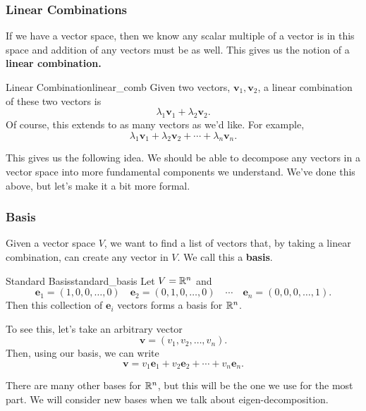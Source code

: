         \subsubsection{Linear Combinations}
        If we have a vector space, then we know any scalar multiple of a vector is in this space and addition of any vectors must be as well.  This gives us the notion of a \textbf{linear combination.}
        
        \begin{ex}{Linear Combination}{linear_comb}
        Given two vectors, $\mathbf{v}_1, \mathbf{v}_2$, a linear combination of these two vectors is 
        \[
        \lambda_1 \mathbf{v}_1 + \lambda_2 \mathbf{v}_2.
        \]
        Of course, this extends to as many vectors as we'd like. For example,
        \[
        \lambda_1 \mathbf{v}_1 + \lambda_2 \mathbf{v}_2 + \cdots + \lambda_n \mathbf{v}_n.
        \]
        \end{ex}
        
        This gives us the following idea.  We should be able to decompose any vectors in a vector space into more fundamental components we understand.  We've done this above, but let's make it a bit more formal.
        
        \subsubsection{Basis}
        Given a vector space $V$, we want to find a list of vectors that, by taking a linear combination, can create any vector in $V$.  We call this a \textbf{basis}.
        
        \begin{ex}{Standard Basis}{standard_basis}
        Let $V=\mathbb{R}^n$ and
        \[
        \mathbf{e}_1=(1,0,0,\dots,0) \quad \mathbf{e}_2=(0,1,0,\dots,0) \quad \cdots \quad \mathbf{e}_n=(0,0,0,\dots,1). 
        \]
        Then this collection of $\mathbf{e}_i$ vectors forms a basis for $\mathbb{R}^n$.  
        
        To see this, let's take an arbitrary vector 
        \[
        \mathbf{v}=(v_1,v_2,\dots,v_n).
        \]
        Then, using our basis, we can write
        \[
        \mathbf{v}=v_1 \mathbf{e}_1 + v_2 \mathbf{e}_2 + \cdots + v_n \mathbf{e}_n.
        \]
        
        There are many other bases for $\mathbb{R}^n$, but this will be the one we use for the most part.  We will consider new bases when we talk about eigen-decomposition.
        \end{ex}
        
